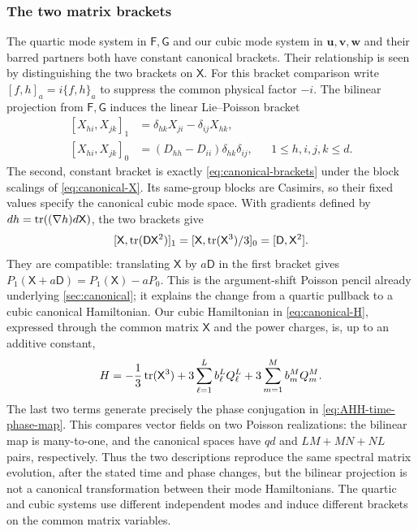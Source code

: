 \subsubsection{The two matrix brackets}

The quartic mode system in $\mathsf F,\mathsf G$ and our cubic mode
system in $\boldsymbol u,\boldsymbol v,\boldsymbol w$ and their barred
partners both have constant canonical brackets. Their
relationship is seen by distinguishing the two brackets on
$\mathsf X$. For this bracket comparison write $[f,h]_a=i\{f,h\}_a$ to
suppress the common physical factor $-i$. The bilinear projection
from $\mathsf F,\mathsf G$ induces the linear Lie--Poisson bracket
\begin{equation}\label{eq:AHH-two-brackets}
\begin{aligned}
 [X_{hi},X_{jk}]_1&=\delta_{hk}X_{ji}-\delta_{ij}X_{hk},\\
 [X_{hi},X_{jk}]_0&=(D_{hh}-D_{ii})\delta_{hk}\delta_{ij},
 &&1\leq h,i,j,k\leq d.
\end{aligned}
\end{equation}
The second, constant bracket is exactly
\cref{eq:canonical-brackets} under the block scalings of
\cref{eq:canonical-X}. Its same-group blocks are Casimirs, so their
fixed values specify the canonical cubic mode space. With gradients
defined by $dh=\operatorname{tr}((\nabla h)d\mathsf X)$, the two brackets give
\begin{equation}\label{eq:AHH-Lenard}
 [\mathsf X,\operatorname{tr}(\mathsf D\mathsf X^2)]_1
 =[\mathsf X,\operatorname{tr}(\mathsf X^3)/3]_0
 =[\mathsf D,\mathsf X^2].
\end{equation}
They are compatible: translating $\mathsf X$ by $a\mathsf D$ in the
first bracket gives $P_1(\mathsf X+a\mathsf D)=P_1(\mathsf X)-aP_0$.
This is the argument-shift Poisson pencil already underlying
\cref{sec:canonical}; it explains the change from a quartic pullback
to a cubic canonical Hamiltonian. Our cubic Hamiltonian in
\cref{eq:canonical-H}, expressed through the common matrix
$\mathsf X$ and the power charges, is, up to an additive constant,
\begin{equation}\label{eq:AHH-cubic-H}
 H=-\frac13\operatorname{tr}(\mathsf X^3)
   +3\sum_{\ell=1}^{L}b_\ell^L Q_\ell^L
   +3\sum_{m=1}^{M}b_m^M Q_m^M.
\end{equation}
The last two terms generate precisely the phase conjugation in
\cref{eq:AHH-time-phase-map}. This compares vector fields on two
Poisson realizations: the bilinear map is many-to-one, and the
canonical spaces have $qd$ and $LM+MN+NL$ pairs, respectively.
Thus the two descriptions reproduce the same spectral matrix evolution,
after the stated time and phase changes, but the bilinear projection
is not a canonical transformation between their mode Hamiltonians.
The quartic and cubic systems use different independent modes and
induce different brackets on the common matrix variables.


